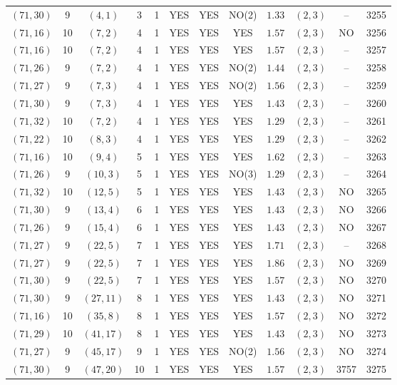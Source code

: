 \begin{longtable}{|c|c|c|c|c|c|c|c|c|c|c|c|}
$(71,30)$ & 9 & $(4,1)$ & 3 & 1 & YES & YES & NO(2) & $1.33$ & $(2,3)$ & -- & 3255\\
$(71,16)$ & 10 & $(7,2)$ & 4 & 1 & YES & YES & YES & $1.57$ & $(2,3)$ & NO & 3256\\
$(71,16)$ & 10 & $(7,2)$ & 4 & 1 & YES & YES & YES & $1.57$ & $(2,3)$ & -- & 3257\\
$(71,26)$ & 9 & $(7,2)$ & 4 & 1 & YES & YES & NO(2) & $1.44$ & $(2,3)$ & -- & 3258\\
$(71,27)$ & 9 & $(7,3)$ & 4 & 1 & YES & YES & NO(2) & $1.56$ & $(2,3)$ & -- & 3259\\
$(71,30)$ & 9 & $(7,3)$ & 4 & 1 & YES & YES & YES & $1.43$ & $(2,3)$ & -- & 3260\\
$(71,32)$ & 10 & $(7,2)$ & 4 & 1 & YES & YES & YES & $1.29$ & $(2,3)$ & -- & 3261\\
$(71,22)$ & 10 & $(8,3)$ & 4 & 1 & YES & YES & YES & $1.29$ & $(2,3)$ & -- & 3262\\
$(71,16)$ & 10 & $(9,4)$ & 5 & 1 & YES & YES & YES & $1.62$ & $(2,3)$ & -- & 3263\\
$(71,26)$ & 9 & $(10,3)$ & 5 & 1 & YES & YES & NO(3) & $1.29$ & $(2,3)$ & -- & 3264\\
$(71,32)$ & 10 & $(12,5)$ & 5 & 1 & YES & YES & YES & $1.43$ & $(2,3)$ & NO & 3265\\
$(71,30)$ & 9 & $(13,4)$ & 6 & 1 & YES & YES & YES & $1.43$ & $(2,3)$ & NO & 3266\\
$(71,26)$ & 9 & $(15,4)$ & 6 & 1 & YES & YES & YES & $1.43$ & $(2,3)$ & NO & 3267\\
$(71,27)$ & 9 & $(22,5)$ & 7 & 1 & YES & YES & YES & $1.71$ & $(2,3)$ & -- & 3268\\
$(71,27)$ & 9 & $(22,5)$ & 7 & 1 & YES & YES & YES & $1.86$ & $(2,3)$ & NO & 3269\\
$(71,30)$ & 9 & $(22,5)$ & 7 & 1 & YES & YES & YES & $1.57$ & $(2,3)$ & NO & 3270\\
$(71,30)$ & 9 & $(27,11)$ & 8 & 1 & YES & YES & YES & $1.43$ & $(2,3)$ & NO & 3271\\
$(71,16)$ & 10 & $(35,8)$ & 8 & 1 & YES & YES & YES & $1.57$ & $(2,3)$ & NO & 3272\\
$(71,29)$ & 10 & $(41,17)$ & 8 & 1 & YES & YES & YES & $1.43$ & $(2,3)$ & NO & 3273\\
$(71,27)$ & 9 & $(45,17)$ & 9 & 1 & YES & YES & NO(2) & $1.56$ & $(2,3)$ & NO & 3274\\
$(71,30)$ & 9 & $(47,20)$ & 10 & 1 & YES & YES & YES & $1.57$ & $(2,3)$ & 3757 & 3275\\

\end{longtable}
